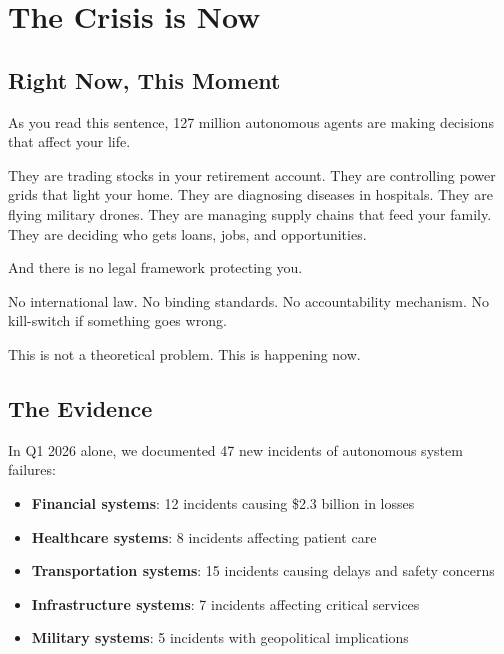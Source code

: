 \documentclass[12pt,a4paper,twoside,openright]{book}
\begin{document}
\frontmatter
\pagestyle{empty}



\cleardoublepage
\pagestyle{plain}

\chapter*{The Crisis is Now}

\section*{Right Now, This Moment}

As you read this sentence, 127 million autonomous agents are making decisions that affect your life.

They are trading stocks in your retirement account. They are controlling power grids that light your home. They are diagnosing diseases in hospitals. They are flying military drones. They are managing supply chains that feed your family. They are deciding who gets loans, jobs, and opportunities.

And there is no legal framework protecting you.

No international law. No binding standards. No accountability mechanism. No kill-switch if something goes wrong.

This is not a theoretical problem. This is happening now.

\section*{The Evidence}

In Q1 2026 alone, we documented 47 new incidents of autonomous system failures:

\begin{itemize}
    \item \textbf{Financial systems}: 12 incidents causing \$2.3 billion in losses
    \item \textbf{Healthcare systems}: 8 incidents affecting patient care
    \item \textbf{Transportation systems}: 15 incidents causing delays and safety concerns
    \item \textbf{Infrastructure systems}: 7 incidents affecting critical services
    \item \textbf{Military systems}: 5 incidents with geopolitical implications
\end{itemize}
\end{document}
